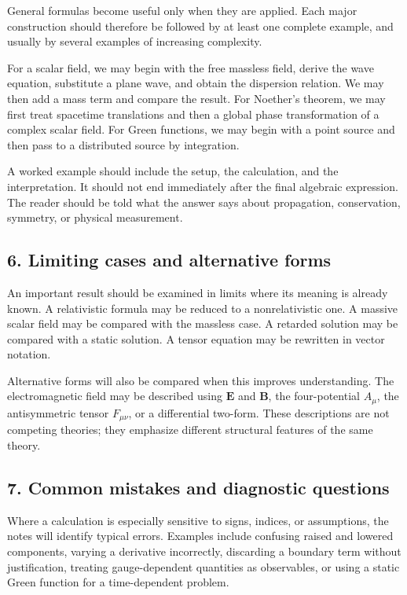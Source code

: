 General formulas become useful only when they are applied. Each major construction should therefore be followed by at least one complete example, and usually by several examples of increasing complexity.

For a scalar field, we may begin with the free massless field, derive the wave equation, substitute a plane wave, and obtain the dispersion relation. We may then add a mass term and compare the result. For Noether's theorem, we may first treat spacetime translations and then a global phase transformation of a complex scalar field. For Green functions, we may begin with a point source and then pass to a distributed source by integration.

A worked example should include the setup, the calculation, and the interpretation. It should not end immediately after the final algebraic expression. The reader should be told what the answer says about propagation, conservation, symmetry, or physical measurement.

\subsection*{6. Limiting cases and alternative forms}

An important result should be examined in limits where its meaning is already known. A relativistic formula may be reduced to a nonrelativistic one. A massive scalar field may be compared with the massless case. A retarded solution may be compared with a static solution. A tensor equation may be rewritten in vector notation.

Alternative forms will also be compared when this improves understanding. The electromagnetic field may be described using \(\mathbf{E}\) and \(\mathbf{B}\), the four-potential \(A_{\mu}\), the antisymmetric tensor \(F_{\mu\nu}\), or a differential two-form. These descriptions are not competing theories; they emphasize different structural features of the same theory.

\subsection*{7. Common mistakes and diagnostic questions}

Where a calculation is especially sensitive to signs, indices, or assumptions, the notes will identify typical errors. Examples include confusing raised and lowered components, varying a derivative incorrectly, discarding a boundary term without justification, treating gauge-dependent quantities as observables, or using a static Green function for a time-dependent problem.

